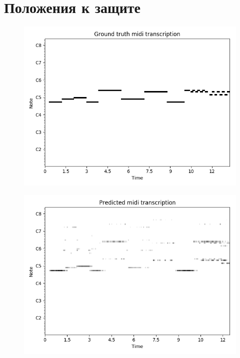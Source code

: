 \documentclass[unicode]{beamer}
\begin{document}
\section{Положения к защите}
\begin{frame}
\begin{figure}
  \includegraphics[scale=.6]{res/organ-note-groundtruth.png}
\end{figure}
\end{frame}

\begin{frame}
\begin{figure}
  \includegraphics[scale=.6]{res/organ-overfit-028-acoustic.png}
\end{figure}
\end{frame}
\end{document}
